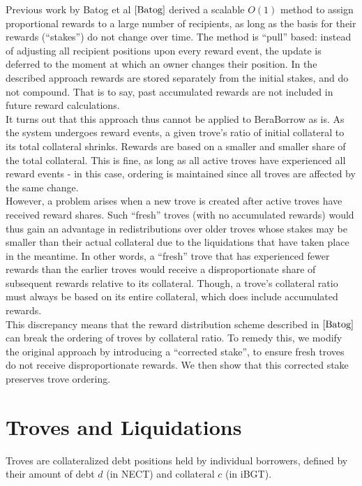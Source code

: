 \documentclass[reqno]{article}
\begin{document}
Previous work by Batog et al $\cite{Batog}$ derived a scalable $O(1)$ method to assign proportional rewards to a large number of recipients, as long as the basis for their rewards (“stakes”) do not change over time. The method is “pull” based: instead of adjusting all recipient positions upon every reward event, the update is deferred to the moment at which an owner changes their position. In the described approach rewards are stored separately from the initial stakes, and do not compound. That is to say, past accumulated rewards are not included in future reward calculations. \\

It turns out that this approach thus cannot be applied to BeraBorrow as is. As the system undergoes reward events, a given trove’s ratio of initial collateral to its total collateral shrinks. Rewards are based on a smaller and smaller share of the total collateral. This is fine, as long as all active troves have experienced all reward events - in this case, ordering is maintained since all troves are affected by the same change. \\

However, a problem arises when a new trove is created after active troves have received reward shares.  Such “fresh” troves (with no accumulated rewards) would thus gain an advantage in redistributions over older troves whose stakes may be smaller than their actual collateral due to the liquidations that have taken place in the meantime. In other words, a “fresh” trove that has experienced fewer rewards than the earlier troves would receive a disproportionate share of subsequent rewards relative to its collateral. Though, a trove's collateral ratio must always be based on its entire collateral, which does include accumulated rewards.  \\

This discrepancy means that the reward distribution scheme described in $\cite{Batog}$ can break the ordering of troves by collateral ratio. To remedy this, we modify the original approach by introducing a “corrected stake”, to ensure fresh troves do not receive disproportionate rewards. We then show that this corrected stake preserves trove ordering. \\


\section{Troves and Liquidations}
Troves are collateralized debt positions held by individual borrowers, defined by their amount of debt $d$ (in NECT) and collateral $c$ (in iBGT).
\end{document}
